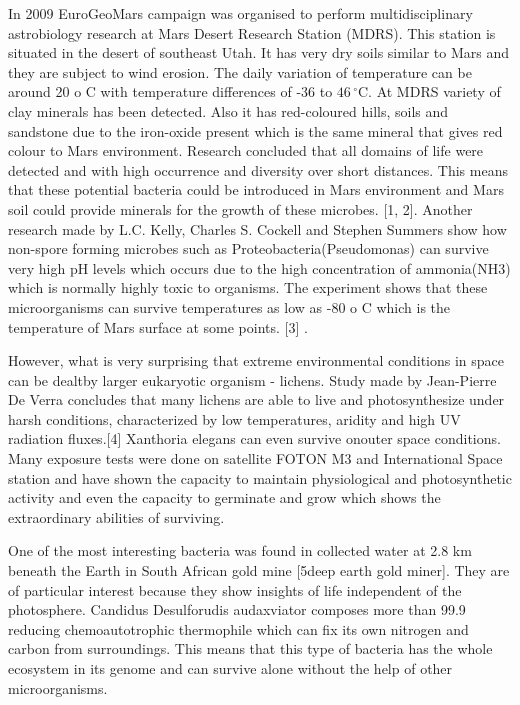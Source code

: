 \documentclass[12pt]{article}
\begin{document}
In 2009 EuroGeoMars campaign was organised to perform multidisciplinary astrobiology research at Mars Desert Research Station (MDRS). This station is situated in the desert of southeast Utah. It has very dry soils similar to Mars and they are subject to wind erosion. The daily variation of temperature can be around 20 o C with temperature differences of -36 to $46\,^{\circ}\mathrm{C}$.
At MDRS variety of clay minerals has been detected. Also it has red-coloured hills, soils and
sandstone due to the iron-oxide present which is the same mineral that gives red colour to Mars
environment. Research concluded that all domains of life were detected and with high
occurrence and diversity over short distances. This means that these potential bacteria could be
introduced in Mars environment and Mars soil could provide minerals for the growth of these
microbes.\cite{} [1, 2]. Another research made by L.C. Kelly, Charles S. Cockell and Stephen
Summers show how non-spore forming microbes such as Proteobacteria(Pseudomonas) can
survive very high pH levels which occurs due to the high concentration of ammonia(NH3)
which is normally highly toxic to organisms. The experiment shows that these microorganisms
can survive temperatures as low as -80 o C which is the temperature of Mars surface at some
points.\cite{} [3] .


However, what is very surprising that extreme environmental conditions in space can be dealtby larger eukaryotic organism - lichens. Study made by Jean-Pierre De Verra concludes that many lichens are able to live and photosynthesize under harsh conditions, characterized by low temperatures, aridity and high UV radiation fluxes.\cite{}[4] Xanthoria elegans can even survive onouter space conditions. Many exposure tests were done on satellite FOTON M3 and International Space station and have shown the capacity to maintain physiological and photosynthetic activity and even the capacity to germinate and grow which shows the extraordinary abilities of surviving.

One of the most  interesting bacteria was found in collected water at 2.8 km beneath the Earth in South African gold mine [5deep earth gold miner]. They are of particular interest because
they show insights of life independent of the photosphere. Candidus Desulforudis audaxviator composes more than 99.9%
reducing chemoautotrophic thermophile which can fix its own nitrogen and carbon from surroundings. This means that this type of bacteria has the whole ecosystem in its genome and can survive alone without the help of other microorganisms.
\end{document}

